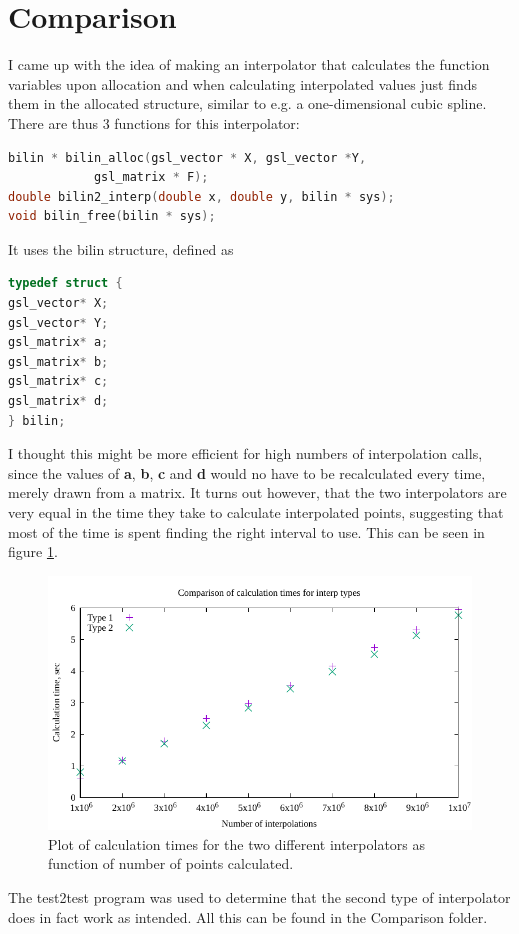 \documentclass[a4paper, UKenglish]{article}
\begin{document}
\section{Comparison}
I came up with the idea of making an interpolator that calculates the function variables upon allocation and when calculating interpolated values just finds them in the allocated structure, similar to e.g. a one-dimensional cubic spline. There are thus 3 functions for this interpolator:

\hspace{-0.5cm}\begin{minipage}{\linewidth}
	\begin{mdframed}[backgroundcolor=mygrey,linecolor=mygrey]
		\begin{lstlisting}[language=c]
bilin * bilin_alloc(gsl_vector * X, gsl_vector *Y, 
			gsl_matrix * F);
double bilin2_interp(double x, double y, bilin * sys);
void bilin_free(bilin * sys);
		\end{lstlisting}
	\end{mdframed}
\end{minipage}
It uses the bilin structure, defined as
\begin{mdframed}[backgroundcolor=mygrey,linecolor=mygrey]
	\begin{lstlisting}[language=c]
typedef struct {
gsl_vector* X;
gsl_vector* Y;
gsl_matrix* a;
gsl_matrix* b;
gsl_matrix* c;
gsl_matrix* d;
} bilin;
	\end{lstlisting}
\end{mdframed}
I thought this might be more efficient for high numbers of interpolation calls, since the values of \textbf{a}, \textbf{b}, \textbf{c} and \textbf{d} would no have to be recalculated every time, merely drawn from a matrix. It turns out however, that the two interpolators are very equal in the time they take to calculate interpolated points, suggesting that most of the time is spent finding the right interval to use. This can be seen in figure \ref{fig:times}.
\begin{figure}
	\includegraphics{times.pdf}
	\caption{Plot of calculation times for the two different interpolators as function of number of points calculated.}
	\label{fig:times}
\end{figure}

The test2test program was used to determine that the second type of interpolator does in fact work as intended. All this can be found in the Comparison folder.
\end{document}
